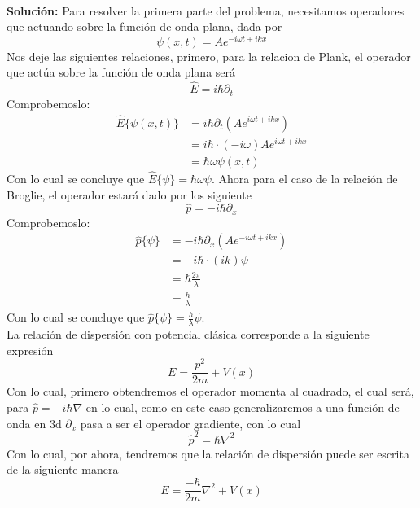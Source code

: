 \documentclass[../main_ej.tex]{subfiles}
\begin{document}
\\
\textbf{Solución:} Para resolver la primera parte del problema, necesitamos operadores que actuando sobre la función de onda plana, dada por
\begin{equation*}
  \psi(x,t) = Ae^{-i\omega t + ikx}
\end{equation*}
Nos deje las siguientes relaciones, primero, para la relacion de Plank, el operador que actúa sobre la función de onda plana será
\begin{equation*}
  \hat{E} = i\hbar \partial_t
\end{equation*}
Comprobemoslo:
\begin{align*}
  \hat{E}\{\psi(x,t)\}  & = i\hbar \partial_t \left( Ae^{i\omega t + ikx} \right) \\
  & = i\hbar\cdot (-i\omega) A e^{i\omega t + ikx} \\
  & = \hbar\omega \psi(x,t)
\end{align*}
Con lo cual se concluye que $\hat{E}\{\psi\} = \hbar \omega \psi$. Ahora para el caso de la relación de Broglie, el operador estará dado por los siguiente
\begin{equation*}
  \hat{p} = -i\hbar \partial_x
\end{equation*}
Comprobemoslo:
\begin{align*}
  \hat{p}\{\psi\} & = -i\hbar \partial_x \left( Ae^{-i\omega t+ikx} \right) \\
  & = -i\hbar \cdot \left( ik \right) \psi \\
  & = \hbar \frac{2\pi}{\lambda} \\
  & = \frac{h}{\lambda}
\end{align*}
Con lo cual se concluye que $\hat{p}\{\psi\}=\frac{h}{\lambda}\psi$.  \\
La relación de dispersión con potencial clásica corresponde a la siguiente expresión
\begin{equation}
  E = \frac{p^2}{2m} + V(x)
\end{equation}
Con lo cual, primero obtendremos el operador momenta al cuadrado, el cual será, para $\hat{p}=-i\hbar\nabla$ en lo cual, como en este caso generalizaremos a una función de onda en 3d $\partial_x$ pasa a ser el operador gradiente, con lo cual
\begin{equation*}
  \hat{p}^2 = \hbar \nabla^2
\end{equation*}
Con lo cual, por ahora, tendremos que la relación de dispersión puede ser escrita de la siguiente manera
\begin{equation*}
  E = \frac{-\hbar}{2m}\nabla^2 + V(x)
\end{equation*}
\end{document}
